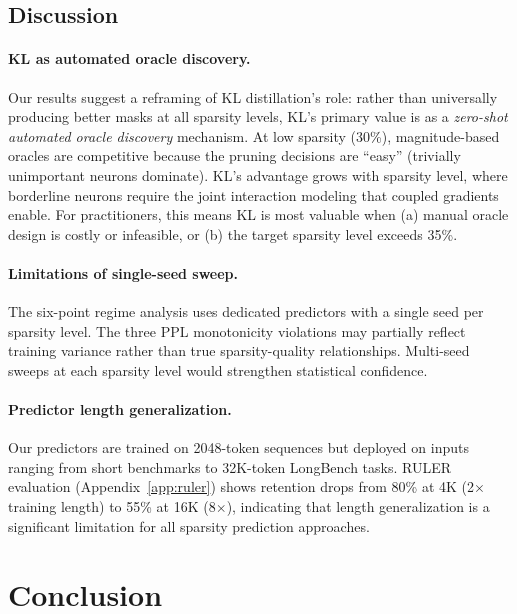\documentclass[11pt,a4paper]{article}
\begin{document}
\subsection{Discussion}
\label{sec:discussion}

\paragraph{KL as automated oracle discovery.} Our results suggest a reframing of KL distillation's role: rather than universally producing better masks at all sparsity levels, KL's primary value is as a \emph{zero-shot automated oracle discovery} mechanism. At low sparsity (30\%), magnitude-based oracles are competitive because the pruning decisions are ``easy'' (trivially unimportant neurons dominate). KL's advantage grows with sparsity level, where borderline neurons require the joint interaction modeling that coupled gradients enable. For practitioners, this means KL is most valuable when (a) manual oracle design is costly or infeasible, or (b) the target sparsity level exceeds 35\%.

\paragraph{Limitations of single-seed sweep.} The six-point regime analysis uses dedicated predictors with a single seed per sparsity level. The three PPL monotonicity violations may partially reflect training variance rather than true sparsity-quality relationships. Multi-seed sweeps at each sparsity level would strengthen statistical confidence.

\paragraph{Predictor length generalization.} Our predictors are trained on 2048-token sequences but deployed on inputs ranging from short benchmarks to 32K-token LongBench tasks. RULER evaluation (Appendix~\ref{app:ruler}) shows retention drops from 80\% at 4K (2$\times$ training length) to 55\% at 16K (8$\times$), indicating that length generalization is a significant limitation for all sparsity prediction approaches.

\section{Conclusion}
\label{sec:conclusion}
\end{document}
